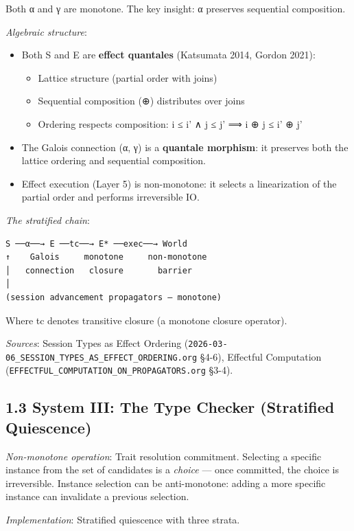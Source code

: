 \documentclass[11pt]{article}
\begin{document}
Both α and γ are monotone. The key insight: α preserves sequential composition.

\emph{Algebraic structure}:
\begin{itemize}
\item Both S and E are \textbf{effect quantales} (Katsumata 2014, Gordon 2021):
\begin{itemize}
\item Lattice structure (partial order with joins)
\item Sequential composition (⊕) distributes over joins
\item Ordering respects composition: i ≤ i' ∧ j ≤ j' ⟹ i ⊕ j ≤ i' ⊕ j'
\end{itemize}
\item The Galois connection (α, γ) is a \textbf{quantale morphism}: it preserves both the
lattice ordering and sequential composition.
\item Effect execution (Layer 5) is non-monotone: it selects a linearization of the
partial order and performs irreversible IO.
\end{itemize}

\emph{The stratified chain}:

\begin{verbatim}
S ──α──→ E ──tc──→ E* ──exec──→ World
↑    Galois     monotone     non-monotone
│   connection   closure       barrier
│
(session advancement propagators — monotone)
\end{verbatim}

Where tc denotes transitive closure (a monotone closure operator).

\emph{Sources}: Session Types as Effect Ordering (\texttt{2026-03-06\_SESSION\_TYPES\_AS\_EFFECT\_ORDERING.org} §4-6),
Effectful Computation (\texttt{EFFECTFUL\_COMPUTATION\_ON\_PROPAGATORS.org} §3-4).
\subsection{1.3 System III: The Type Checker (Stratified Quiescence)}
\label{sec:org9f622f1}

\emph{Non-monotone operation}: Trait resolution commitment. Selecting a specific
instance from the set of candidates is a \emph{choice} — once committed, the choice
is irreversible. Instance selection can be anti-monotone: adding a more specific
instance can invalidate a previous selection.

\emph{Implementation}: Stratified quiescence with three strata.
\end{document}
